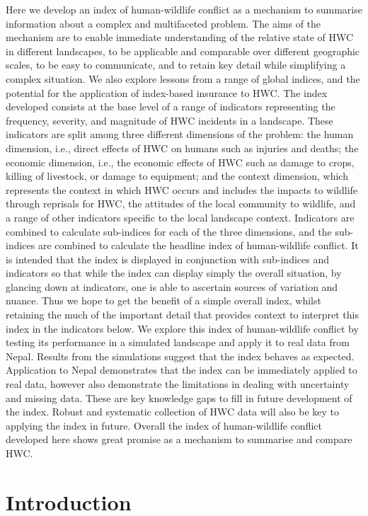 \documentclass[fleqn,10pt]{olplainarticle}
\begin{document}
Here we develop an index of human-wildlife conflict as a mechanism to summarise information about a complex and multifaceted problem. The aims of the mechanism are to enable immediate understanding of the relative state of HWC in different landscapes, to be applicable and comparable over different geographic scales, to be easy to communicate, and to retain key detail while simplifying a complex situation. We also explore lessons from a range of global indices, and the potential for the application of index-based insurance to HWC.
The index developed consists at the base level of a range of indicators representing the frequency, severity, and magnitude of HWC incidents in a landscape. These indicators are split among three different dimensions of the problem: the human dimension, i.e., direct effects of HWC on humans such as injuries and deaths; the economic dimension, i.e., the economic effects of HWC such as damage to crops, killing of livestock, or damage to equipment; and the context dimension, which represents the context in which HWC occurs and includes the impacts to wildlife through reprisals for HWC, the attitudes of the local community to wildlife, and a range of other indicators specific to the local landscape context. Indicators are combined to calculate sub-indices for each of the three dimensions, and the sub-indices are combined to calculate the headline index of human-wildlife conflict. It is intended that the index is displayed in conjunction with sub-indices and indicators so that while the index can display simply the overall situation, by glancing down at indicators, one is able to ascertain sources of variation and nuance. Thus we hope to get the benefit of a simple overall index, whilst retaining the much of the important detail that provides context to interpret this index in the indicators below.
We explore this index of human-wildlife conflict by testing its performance in a simulated landscape and apply it to real data from Nepal. Results from the simulations suggest that the index behaves as expected. Application to Nepal demonstrates that the index can be immediately applied to real data, however also demonstrate the limitations in dealing with uncertainty and missing data. These are key knowledge gaps to fill in future development of the index. Robust and systematic collection of HWC data will also be key to applying the index in future. Overall the index of human-wildlife conflict developed here shows great promise as a mechanism to summarise and compare HWC.


\section*{Introduction}
\end{document}

